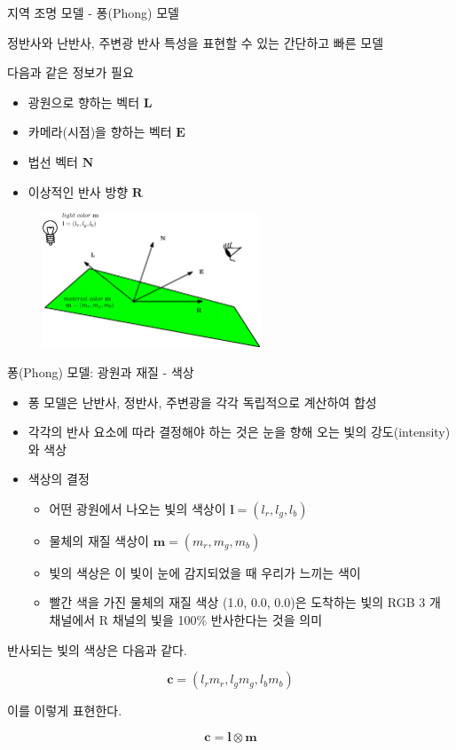 \begin{frame}[fragile]{지역 조명 모델 - 퐁(Phong) 모델}

정반사와 난반사, 주변광 반사 특성을 표현할 수 있는 간단하고 빠른 모델

다음과 같은 정보가 필요

\begin{itemize}
\item 광원으로 향하는 벡터 $\mathbf L$
\item 카메라(시점)을 향하는 벡터 $\mathbf E$
\item 법선 벡터 $\mathbf N$
\item 이상적인 반사 방향 $\mathbf R$
\end{itemize}


\begin{figure}[h!]
  \centering
    \includegraphics[height=4cm]{Math_lighting/lightingVectors.eps}
\end{figure}

\end{frame}

\begin{frame}[fragile]{퐁(Phong) 모델: 광원과 재질 - 색상}

\begin{itemize}
\item 퐁 모델은 난반사, 정반사, 주변광을 각각 독립적으로 계산하여 합성
\item 각각의 반사 요소에 따라 결정해야 하는 것은 눈을 향해 오는 빛의 강도(intensity)와 색상
\item 색상의 결정
	\begin{itemize}
	\item 어떤 광원에서 나오는 빛의 색상이 ${\mathbf l} = (l_r, l_g, l_b)$
	\item 물체의 재질 색상이 ${\mathbf m} = (m_r, m_g, m_b)$
	\item 빛의 색상은 이 빛이 눈에 감지되었을 때 우리가 느끼는 색이
	\item 빨간 색을 가진 물체의 재질 색상 (1.0, 0.0, 0.0)은 도착하는 빛의 RGB 3 개 채널에서 R 채널의 빛을 100\% 반사한다는 것을 의미
	\end{itemize}
\end{itemize}

반사되는 빛의 색상은 다음과 같다.

$$\mathbf c = (l_r m_r, l_g m_g, l_b m_b)$$

이를 이렇게 표현한다.

$$\mathbf c = \mathbf l \otimes \mathbf m $$

\end{frame}



